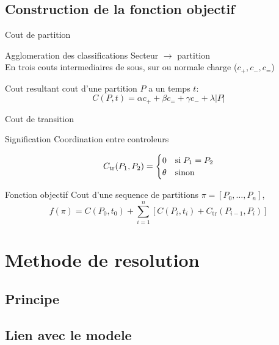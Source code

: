 \documentclass[tikz]{beamer}
\begin{document}
\subsection{Construction de la fonction objectif}
\begin{frame}{Cout de partition}
  \begin{block}{Agglomeration des classifications}
    Secteur \(\to\) partition\\
    En trois couts intermediaires de sous, sur ou normale charge (\(c_+, c_-,
    c_=\))
  \end{block}
  \begin{block}{Cout resultant}
    cout d'une partition \(P\) a un temps \(t\):
    \begin{equation}
      C(P,t) = \alpha c_+ + \beta c_= + \gamma c_- + \lambda \vert P \vert
    \end{equation}
  \end{block}
\end{frame}
\begin{frame}[c]{Cout de transition}
  \begin{block}{Signification}
  Coordination entre controleurs
  \end{block}
  \begin{equation}
    C_\text{tr}(P_1, P_2) =
    \begin{cases}
      0 & \text{si\;} P_1 = P_2\\
      \theta & \text{sinon}
    \end{cases}
  \end{equation}
\end{frame}
\begin{frame}[c]{Fonction objectif}
  Cout d'une sequence de partitions \(\pi = [P_0, \dots, P_n]\),
  \begin{equation}
    f(\pi) = C(P_0, t_0) + \sum_{i=1}^n \left[
      C(P_i, t_i) + C_\text{tr}(P_{i-1}, P_i)
    \right]
  \end{equation}
\end{frame}

\section{Methode de resolution}

\subsection{Principe}
\subsection{Lien avec le modele}
\end{document}
